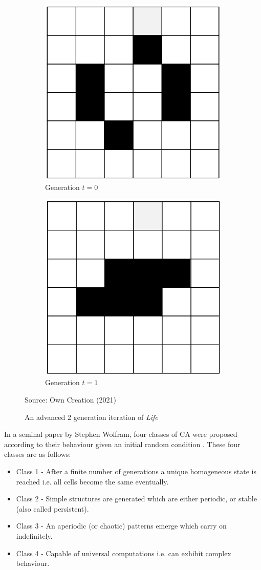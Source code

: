 \begin{figure}[H]
\centering
\begin{subfigure}{.5\textwidth}
  \centering
  \includegraphics[width=.4\linewidth]{Figures/toad1.png}
  \caption{Generation $t = 0$}
\end{subfigure}%
\begin{subfigure}{.5\textwidth}
  \centering
  \includegraphics[width=.4\linewidth]{Figures/toad2.png}
  \caption{Generation $t = 1$}
\end{subfigure}
\caption{An advanced 2 generation iteration of \textsl{Life}}
\begin{center}
Source: Own Creation (2021)
\end{center}
\end{figure}
In a seminal paper by Stephen Wolfram, four classes of CA were proposed according to their behaviour given an initial random condition .\citep{Wolfram1984} These four classes are as follows:
\begin{itemize}
\item Class 1 - After a finite number of generations a unique homogeneous state is reached i.e. all cells become the same eventually.
\item Class 2 - Simple structures are generated which are either periodic, or stable (also called persistent).
\item Class 3 - An aperiodic (or chaotic) patterns emerge which carry on indefinitely.
\item Class 4 - Capable of universal computations i.e. can exhibit complex behaviour. 
\end{itemize}
